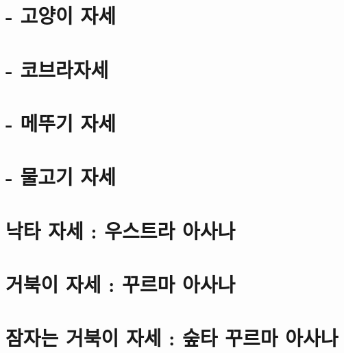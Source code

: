 \documentclass[12pt, a4paper, oneside]{book}
\let\stdsection\section
\renewcommand\section{\newpage\stdsection}
\begin{document}
		\section{ - 고양이 자세 }
	
	
		\section{ - 코브라자세 }
	
		\section{ -  메뚜기 자세}
	
		\section{ - 물고기 자세}
	
		\section{  낙타 자세 : 우스트라 아사나}
	


		\section{ 거북이 자세 : 꾸르마 아사나 }

		\section{ 잠자는 거북이 자세 : 숲타 꾸르마 아사나 }
\end{document}
